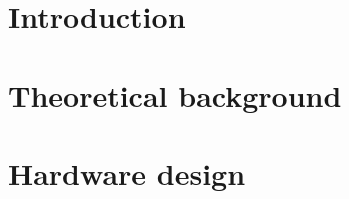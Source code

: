 \documentclass[12pt,oneside]{report} %
\begin{document}


\clearpage
{} 



\setlength{\parskip}{0pt}

% 

\tableofcontents
\clearpage

\listoftables
\clearpage

\listoffigures
\clearpage

\setcounter{page}{1}

\chapter{Introduction}





\chapter{Theoretical background}
\label{chapter:theory}






\chapter{Hardware design}




\end{document}
